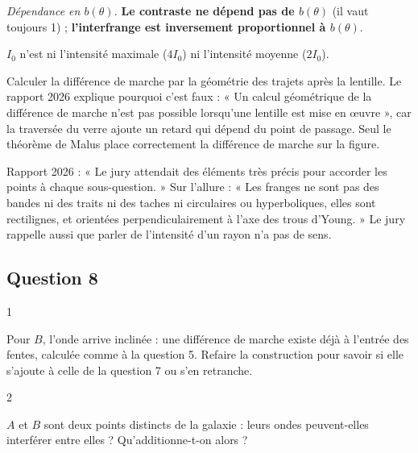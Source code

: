 \documentclass[11pt,a4paper]{article}
\begin{document}
\emph{Dépendance en \(b(\theta)\).} \textbf{Le contraste ne dépend pas de \(b(\theta)\)} (il vaut toujours 1) ; \textbf{l'interfrange est inversement proportionnel à \(b(\theta)\)}.

\begin{piege}

\(I_0\) n'est ni l'intensité maximale (\(4I_0\)) ni l'intensité moyenne (\(2I_0\)).

\end{piege}

\begin{piege}

Calculer la différence de marche par la géométrie des trajets après la lentille. Le rapport 2026 explique pourquoi c'est faux : « Un calcul géométrique de la différence de marche n'est pas possible lorsqu'une lentille est mise en œuvre », car la traversée du verre ajoute un retard qui dépend du point de passage. Seul le théorème de Malus place correctement la différence de marche sur la figure.

\end{piege}

\begin{jury}

Rapport 2026 : « Le jury attendait des éléments très précis pour accorder les points à chaque sous-question. » Sur l'allure : « Les franges ne sont pas des bandes ni des traits ni des taches ni circulaires ou hyperboliques, elles sont rectilignes, et orientées perpendiculairement à l'axe des trous d'Young. » Le jury rappelle aussi que parler de l'intensité d'un rayon n'a pas de sens.

\end{jury}

\hypertarget{question-8}{%
\subsection{Question 8}\label{question-8}}

\begin{indication}{1}

Pour \(B\), l'onde arrive inclinée : une différence de marche existe déjà à l'entrée des fentes, calculée comme à la question 5. Refaire la construction pour savoir si elle s'ajoute à celle de la question 7 ou s'en retranche.

\end{indication}

\begin{indication}{2}

\(A\) et \(B\) sont deux points distincts de la galaxie : leurs ondes peuvent-elles interférer entre elles ? Qu'additionne-t-on alors ?

\end{indication}
\end{document}

